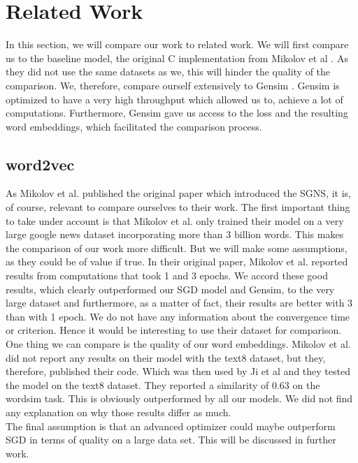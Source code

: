 \section{Related Work}
In this section, we will compare our work to related work. We will first compare us to the baseline model, the original C implementation from Mikolov et al \cite{Mikolov}. As they did not use the same datasets as we, this will hinder the quality of the comparison. We, therefore, compare ourself extensively to Gensim \cite{gensim}. Gensim is optimized to have a very high throughput which allowed us to, achieve a lot of computations. Furthermore, Gensim gave us access to the loss and the resulting word embeddings, which facilitated the comparison process. 

\subsection{word2vec}

As Mikolov et al. published the original paper which introduced the SGNS, it is, of course, relevant to compare ourselves to their work. The first important thing to take under account is that Mikolov et al. only trained their model on a very large google news dataset incorporating more than 3 billion words. This makes the comparison of our work more difficult. But we will make some assumptions, as they could be of value if true. 
In their original paper, Mikolov et al. reported results from computations that took 1 and 3 epochs. We accord these good results, which clearly outperformed our SGD model and Gensim, to the very large dataset and furthermore, as a matter of fact, their results are better with 3 than with 1 epoch. We do not have any information about the convergence time or criterion. Hence it would be interesting to use their dataset for comparison. \\
One thing we can compare is the quality of our word embeddings. Mikolov et al. did not report any results on their model with the text8 dataset, but they, therefore, published their code. Which was then used by Ji et al \cite{intel} and they tested the model on the text8 dataset. They reported a similarity of 0.63 on the wordsim task. This is obviously outperformed by all our models. We did not find any explanation on why those results differ as much. \\
The final assumption is that an advanced optimizer could maybe outperform SGD in terms of quality on a large data set. This will be discussed in further work.
 


